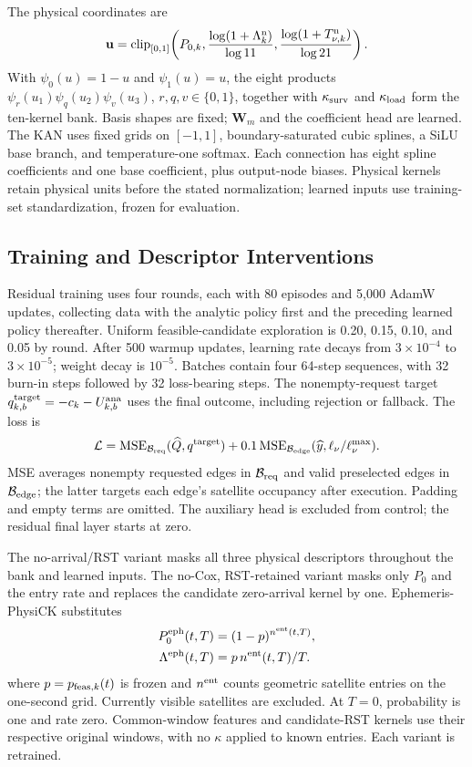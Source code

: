 \documentclass[10pt,letterpaper,journal]{IEEEtran}
\begin{document}
The physical coordinates are
\[
\mathbf u=\operatorname{clip}_{[0,1]}\!\left(
P_{0,k},\frac{\log(1+\Lambda_k^{\rm n})}{\log11},
\frac{\log(1+T_{\nu,k}^{\rm n})}{\log21}\right).
\]
With $\psi_0(u)=1-u$ and $\psi_1(u)=u$, the eight products $\psi_r(u_1)\psi_q(u_2)\psi_v(u_3)$, $r,q,v\in\{0,1\}$, together with $\kappa_{\rm surv}$ and $\kappa_{\rm load}$ form the ten-kernel bank. Basis shapes are fixed; $\mathbf W_m$ and the coefficient head are learned. The KAN uses fixed grids on $[-1,1]$, boundary-saturated cubic splines, a SiLU base branch, and temperature-one softmax. Each connection has eight spline coefficients and one base coefficient, plus output-node biases. Physical kernels retain physical units before the stated normalization; learned inputs use training-set standardization, frozen for evaluation.





\subsection{Training and Descriptor Interventions}
\label{app:training_implementation}
Residual training uses four rounds, each with 80 episodes and 5,000 AdamW updates, collecting data with the analytic policy first and the preceding learned policy thereafter. Uniform feasible-candidate exploration is 0.20, 0.15, 0.10, and 0.05 by round. After 500 warmup updates, learning rate decays from $3\times10^{-4}$ to $3\times10^{-5}$; weight decay is $10^{-5}$. Batches contain four 64-step sequences, with 32 burn-in steps followed by 32 loss-bearing steps. The nonempty-request target $q^{\rm target}_{k,b}=-c_k-U^{\rm ana}_{k,b}$ uses the final outcome, including rejection or fallback. The loss is
\[
\mathcal L=\operatorname{MSE}_{\mathcal B_{\rm req}}(\widehat Q,q^{\rm target})
+0.1\operatorname{MSE}_{\mathcal B_{\rm edge}}
(\widehat y,\ell_\nu/\ell_\nu^{\max}).
\]
MSE averages nonempty requested edges in $\mathcal B_{\rm req}$ and valid preselected edges in $\mathcal B_{\rm edge}$; the latter targets each edge's satellite occupancy after execution. Padding and empty terms are omitted. The auxiliary head is excluded from control; the residual final layer starts at zero.

The no-arrival/RST variant masks all three physical descriptors throughout the bank and learned inputs. The no-Cox, RST-retained variant masks only $P_0$ and the entry rate and replaces the candidate zero-arrival kernel by one. Ephemeris-PhysiCK substitutes
\[
\begin{aligned}
P^{\rm eph}_0(t,T)&=(1-p)^{n^{\rm ent}(t,T)},\\
\Lambda^{\rm eph}(t,T)&=p\,n^{\rm ent}(t,T)/T.
\end{aligned}
\]
where $p=p_{{\rm feas},k}(t)$ is frozen and $n^{\rm ent}$ counts geometric satellite entries on the one-second grid. Currently visible satellites are excluded. At $T=0$, probability is one and rate zero. Common-window features and candidate-RST kernels use their respective original windows, with no $\kappa$ applied to known entries. Each variant is retrained.
\end{document}
